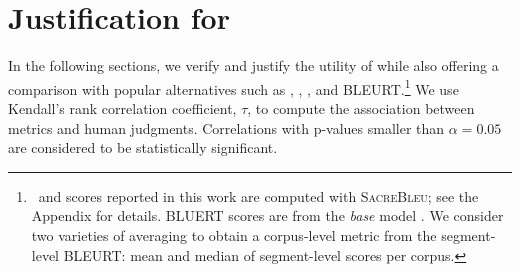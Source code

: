 \section{Justification for }
\label{sec:justific}

In the following sections, we verify and justify the utility of  while also offering a comparison with popular alternatives such as , \bleu, , and BLEURT.\footnote{\bleu\ and  scores reported in this work are computed with \textsc{SacreBleu}; see the Appendix for details.
BLUERT scores are from the \textit{base} model \citep{sellam-etal-2020-bleurt}. We consider two varieties of averaging to obtain a corpus-level metric from the segment-level BLEURT: mean and median of segment-level scores per corpus.
}
We use Kendall's rank correlation coefficient, $\tau$, to compute the association between metrics and human judgments.
Correlations with p-values smaller than $\alpha=0.05$ are considered to be statistically significant.



